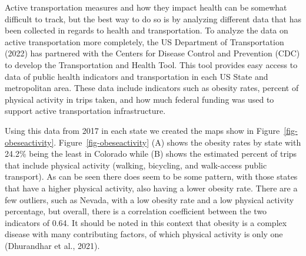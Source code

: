 \documentclass[
  letterpaper,
  DIV=11,
  numbers=noendperiod]{scrreport}
\begin{document}
Active transportation measures and how they impact health can be
somewhat difficult to track, but the best way to do so is by analyzing
different data that has been collected in regards to health and
transportation. To analyze the data on active transportation more
completely, the US Department of Transportation (2022) has partnered
with the Centers for Disease Control and Prevention (CDC) to develop the
Transportation and Health Tool. This tool provides easy access to data
of public health indicators and transportation in each US State and
metropolitan area. These data include indicators such as obesity rates,
percent of physical activity in trips taken, and how much federal
funding was used to support active transportation infrastructure.

Using this data from 2017 in each state we created the maps show in
Figure~\ref{fig-obeseactivity}. Figure~\ref{fig-obeseactivity} (A) shows
the obesity rates by state with 24.2\% being the least in Colorado while
(B) shows the estimated percent of trips that include physical activity
(walking, bicycling, and walk-access public transport). As can be seen
there does seem to be some pattern, with those states that have a higher
physical activity, also having a lower obesity rate. There are a few
outliers, such as Nevada, with a low obesity rate and a low physical
activity percentage, but overall, there is a correlation coefficient
between the two indicators of 0.64. It should be noted in this context
that obesity is a complex disease with many contributing factors, of
which physical activity is only one (Dhurandhar et al., 2021).
\end{document}
